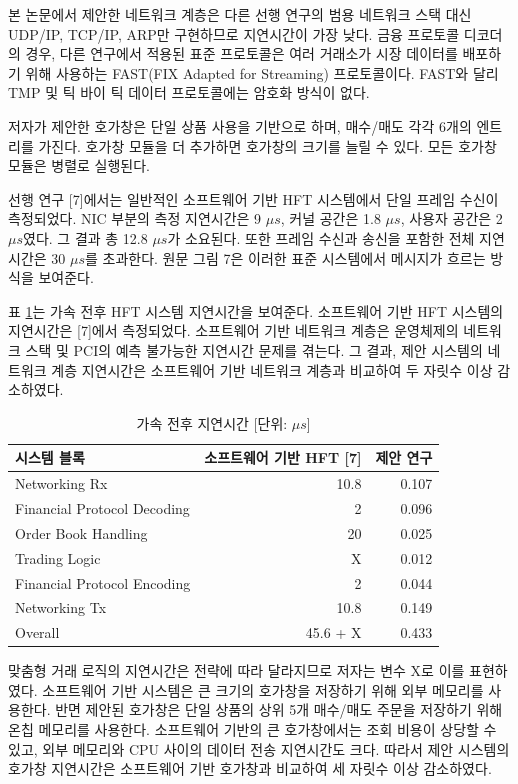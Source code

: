 \documentclass[11pt,a4paper]{article}
\begin{document}
본 논문에서 제안한 네트워크 계층은 다른 선행 연구의 범용 네트워크 스택 대신 UDP/IP, TCP/IP, ARP만 구현하므로 지연시간이 가장 낮다. 금융 프로토콜 디코더의 경우, 다른 연구에서 적용된 표준 프로토콜은 여러 거래소가 시장 데이터를 배포하기 위해 사용하는 FAST(FIX Adapted for Streaming) 프로토콜이다. FAST와 달리 TMP 및 틱 바이 틱 데이터 프로토콜에는 암호화 방식이 없다.

저자가 제안한 호가창은 단일 상품 사용을 기반으로 하며, 매수/매도 각각 6개의 엔트리를 가진다. 호가창 모듈을 더 추가하면 호가창의 크기를 늘릴 수 있다. 모든 호가창 모듈은 병렬로 실행된다.

선행 연구 [7]에서는 일반적인 소프트웨어 기반 HFT 시스템에서 단일 프레임 수신이 측정되었다. NIC 부분의 측정 지연시간은 9 \(\mu s\), 커널 공간은 1.8 \(\mu s\), 사용자 공간은 2 \(\mu s\)였다. 그 결과 총 12.8 \(\mu s\)가 소요된다. 또한 프레임 수신과 송신을 포함한 전체 지연시간은 30 \(\mu s\)를 초과한다. 원문 그림 7은 이러한 표준 시스템에서 메시지가 흐르는 방식을 보여준다.

표 \ref{tab:before-after}는 가속 전후 HFT 시스템 지연시간을 보여준다. 소프트웨어 기반 HFT 시스템의 지연시간은 [7]에서 측정되었다. 소프트웨어 기반 네트워크 계층은 운영체제의 네트워크 스택 및 PCI의 예측 불가능한 지연시간 문제를 겪는다. 그 결과, 제안 시스템의 네트워크 계층 지연시간은 소프트웨어 기반 네트워크 계층과 비교하여 두 자릿수 이상 감소하였다.

\begin{table}[h]
\centering
\caption{가속 전후 지연시간 [단위: \(\mu s\)]}
\label{tab:before-after}
\begin{tabular}{lrr}
\toprule
시스템 블록 & 소프트웨어 기반 HFT [7] & 제안 연구 \\
\midrule
Networking Rx & 10.8 & 0.107 \\
Financial Protocol Decoding & 2 & 0.096 \\
Order Book Handling & 20 & 0.025 \\
Trading Logic & X & 0.012 \\
Financial Protocol Encoding & 2 & 0.044 \\
Networking Tx & 10.8 & 0.149 \\
Overall & 45.6 + X & 0.433 \\
\bottomrule
\end{tabular}
\end{table}

맞춤형 거래 로직의 지연시간은 전략에 따라 달라지므로 저자는 변수 X로 이를 표현하였다. 소프트웨어 기반 시스템은 큰 크기의 호가창을 저장하기 위해 외부 메모리를 사용한다. 반면 제안된 호가창은 단일 상품의 상위 5개 매수/매도 주문을 저장하기 위해 온칩 메모리를 사용한다. 소프트웨어 기반의 큰 호가창에서는 조회 비용이 상당할 수 있고, 외부 메모리와 CPU 사이의 데이터 전송 지연시간도 크다. 따라서 제안 시스템의 호가창 지연시간은 소프트웨어 기반 호가창과 비교하여 세 자릿수 이상 감소하였다.
\end{document}

